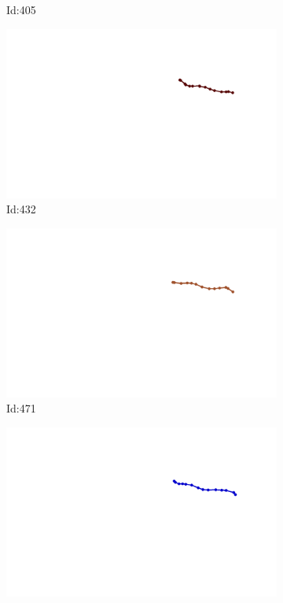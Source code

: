 \documentclass[12pt,twoside]{report}
\begin{document}
\begin{figure}
\begin{subfigure}[b]{0.20\textwidth}
\caption{Id:405}
\end{subfigure}
\begin{subfigure}[b]{0.20\textwidth}
\centering
\includegraphics[width=\textwidth]{../trajectories/432.png}
\caption{Id:432}
\end{subfigure}
\begin{subfigure}[b]{0.20\textwidth}
\centering
\includegraphics[width=\textwidth]{../trajectories/471.png}
\caption{Id:471}
\end{subfigure}
\begin{subfigure}[b]{0.20\textwidth}
\centering
\includegraphics[width=\textwidth]{../trajectories/518.png}

\end{subfigure}
\end{figure}
\end{document}

